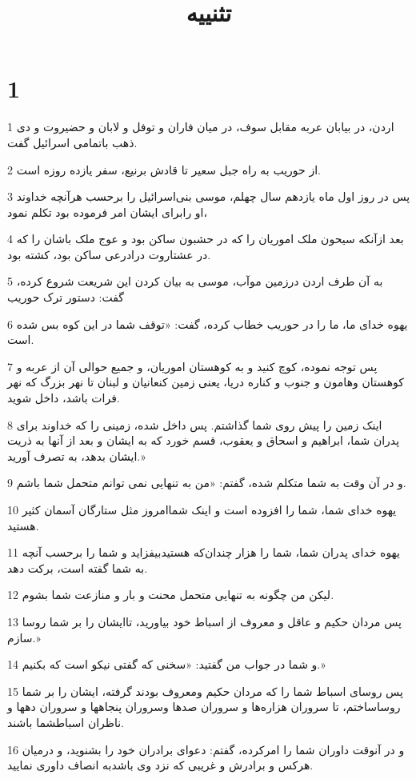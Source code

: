 

\title{تثنييه}

 
\chapter{1}

\par 1 اردن، در بیابان عربه مقابل سوف، در میان فاران و توفل و لابان و حضیروت و دی ذهب باتمامی اسرائیل گفت.
\par 2 از حوریب به راه جبل سعیر تا قادش برنیع، سفر یازده روزه است.
\par 3 پس در روز اول ماه یازدهم سال چهلم، موسی بنی‌اسرائیل را برحسب هرآنچه خداوند او رابرای ایشان امر فرموده بود تکلم نمود،
\par 4 بعد ازآنکه سیحون ملک اموریان را که در حشبون ساکن بود و عوج ملک باشان را که در عشتاروت درادرعی ساکن بود، کشته بود.
\par 5 به آن طرف اردن درزمین موآب، موسی به بیان کردن این شریعت شروع کرده، گفت: دستور ترک حوریب
\par 6 یهوه خدای ما، ما را در حوریب خطاب کرده، گفت: «توقف شما در این کوه بس شده است.
\par 7 پس توجه نموده، کوچ کنید و به کوهستان اموریان، و جمیع حوالی آن از عربه و کوهستان وهامون و جنوب و کناره دریا، یعنی زمین کنعانیان و لبنان تا نهر بزرگ که نهر فرات باشد، داخل شوید.
\par 8 اینک زمین را پیش روی شما گذاشتم. پس داخل شده، زمینی را که خداوند برای پدران شما، ابراهیم و اسحاق و یعقوب، قسم خورد که به ایشان و بعد از آنها به ذریت ایشان بدهد، به تصرف آورید.»
\par 9 و در آن وقت به شما متکلم شده، گفتم: «من به تنهایی نمی توانم متحمل شما باشم.
\par 10 یهوه خدای شما، شما را افزوده است و اینک شماامروز مثل ستارگان آسمان کثیر هستید.
\par 11 یهوه خدای پدران شما، شما را هزار چندان‌که هستیدبیفزاید و شما را برحسب آنچه به شما گفته است، برکت دهد.
\par 12 لیکن من چگونه به تنهایی متحمل محنت و بار و منازعت شما بشوم.
\par 13 پس مردان حکیم و عاقل و معروف از اسباط خود بیاورید، تاایشان را بر شما روسا سازم.»
\par 14 و شما در جواب من گفتید: «سخنی که گفتی نیکو است که بکنیم.»
\par 15 پس روسای اسباط شما را که مردان حکیم ومعروف بودند گرفته، ایشان را بر شما روساساختم، تا سروران هزاره‌ها و سروران صدها وسروران پنجاهها و سروران دهها و ناظران اسباطشما باشند.
\par 16 و در آنوقت داوران شما را امرکرده، گفتم: دعوای برادران خود را بشنوید، و درمیان هرکس و برادرش و غریبی که نزد وی باشدبه انصاف داوری نمایید.
